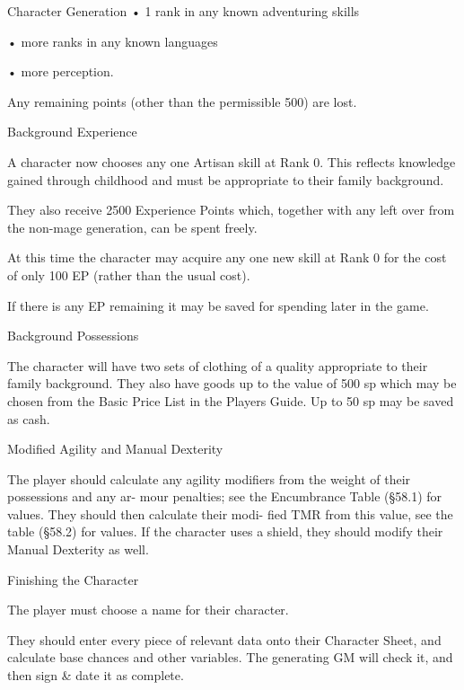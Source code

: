 \begin{Chapter}{Character Generation}
• 1 rank in any known adventuring skills  

• more ranks in any known languages  

• more perception. 

Any  remaining  points  (other  than  the  permissible 
500) are lost. 

Background Experience 

A  character  now  chooses  any  one  Artisan  skill  at 
Rank  0.  This  reflects  knowledge  gained  through 
childhood  and  must  be  appropriate  to  their  family 
background. 

They  also  receive  2500  Experience  Points  which, 
together  with  any  left  over  from  the  non-mage 
generation, can be spent freely. 

At this time the character may acquire any one new 
skill at Rank 0 for the cost of only 100 EP (rather 
than the usual cost). 

If  there  is  any  EP  remaining  it  may  be  saved  for 
spending later in the game. 

Background Possessions 

The  character  will  have  two  sets  of  clothing  of  a 
quality  appropriate  to  their  family  background. 
They  also  have  goods  up  to  the  value  of  500  sp 
which may be chosen from the Basic Price  List in 
the  Players  Guide.  Up  to  50  sp  may  be  saved  as 
cash. 

Modified Agility and Manual Dexterity 

The  player  should  calculate  any  agility  modifiers 
from  the  weight  of  their  possessions  and  any  ar-
mour penalties; see the Encumbrance Table (§58.1) 
for  values.  They  should  then  calculate  their  modi-
fied TMR from this value, see the table (§58.2) for 
values.  If  the  character  uses  a  shield,  they  should 
modify their Manual Dexterity as well. 

Finishing the Character 

The player must choose a name for their character. 

They should enter every piece of relevant data onto 
their  Character  Sheet,  and  calculate  base  chances 
and other variables. The generating GM will check 
it, and then sign \& date it as complete. 

\end{Chapter}
